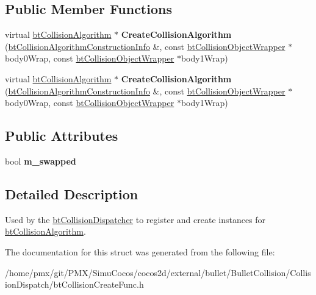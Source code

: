 \subsection*{Public Member Functions}
\begin{DoxyCompactItemize}
\item 
\mbox{\label{structbtCollisionAlgorithmCreateFunc_ad13b8166d51f2174d70676f038493cfd}} 
virtual \hyperlink{classbtCollisionAlgorithm}{bt\+Collision\+Algorithm} $\ast$ {\bfseries Create\+Collision\+Algorithm} (\hyperlink{structbtCollisionAlgorithmConstructionInfo}{bt\+Collision\+Algorithm\+Construction\+Info} \&, const \hyperlink{structbtCollisionObjectWrapper}{bt\+Collision\+Object\+Wrapper} $\ast$body0\+Wrap, const \hyperlink{structbtCollisionObjectWrapper}{bt\+Collision\+Object\+Wrapper} $\ast$body1\+Wrap)
\item 
\mbox{\label{structbtCollisionAlgorithmCreateFunc_ad13b8166d51f2174d70676f038493cfd}} 
virtual \hyperlink{classbtCollisionAlgorithm}{bt\+Collision\+Algorithm} $\ast$ {\bfseries Create\+Collision\+Algorithm} (\hyperlink{structbtCollisionAlgorithmConstructionInfo}{bt\+Collision\+Algorithm\+Construction\+Info} \&, const \hyperlink{structbtCollisionObjectWrapper}{bt\+Collision\+Object\+Wrapper} $\ast$body0\+Wrap, const \hyperlink{structbtCollisionObjectWrapper}{bt\+Collision\+Object\+Wrapper} $\ast$body1\+Wrap)
\end{DoxyCompactItemize}
\subsection*{Public Attributes}
\begin{DoxyCompactItemize}
\item 
\mbox{\label{structbtCollisionAlgorithmCreateFunc_adbcd40f1d695f060dcb527942686e670}} 
bool {\bfseries m\+\_\+swapped}
\end{DoxyCompactItemize}


\subsection{Detailed Description}
Used by the \hyperlink{classbtCollisionDispatcher}{bt\+Collision\+Dispatcher} to register and create instances for \hyperlink{classbtCollisionAlgorithm}{bt\+Collision\+Algorithm}. 

The documentation for this struct was generated from the following file\+:\begin{DoxyCompactItemize}
\item 
/home/pmx/git/\+P\+M\+X/\+Simu\+Cocos/cocos2d/external/bullet/\+Bullet\+Collision/\+Collision\+Dispatch/bt\+Collision\+Create\+Func.\+h\end{DoxyCompactItemize}
